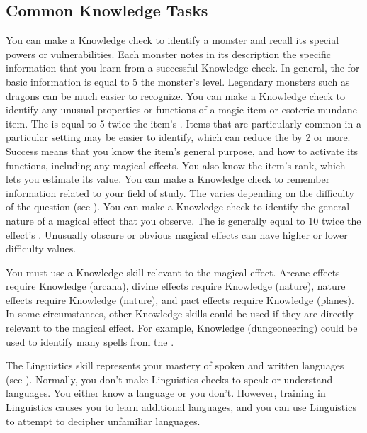     \subsection{Common Knowledge Tasks}
         You can make a Knowledge check to identify a monster and recall its special powers or vulnerabilities.
        Each monster notes in its description the specific information that you learn from a successful Knowledge check.
        In general, the  for basic information is equal to 5 \add the monster's level.
        Legendary monsters such as dragons can be much easier to recognize.
         You can make a Knowledge check to identify any unusual properties or functions of a magic item or esoteric mundane item.
        The  is equal to 5 \add twice the item's .
        Items that are particularly common in a particular setting may be easier to identify, which can reduce the  by 2 or more.
        Success means that you know the item's general purpose, and how to activate its functions, including any magical effects.
        You also know the item's rank, which lets you estimate its value.
         You can make a Knowledge check to remember information related to your field of study.
        The  varies depending on the difficulty of the question (see ).
         You can make a Knowledge check to identify the general nature of a magical effect that you observe.
        The  is generally equal to 10 \add twice the effect's .
        Unusually obscure or obvious magical effects can have higher or lower difficulty values.

        You must use a Knowledge skill relevant to the magical effect.
        Arcane effects require Knowledge (arcana), divine effects require Knowledge (nature), nature effects require Knowledge (nature), and pact effects require Knowledge (planes).
        In some circumstances, other Knowledge skills could be used if they are directly relevant to the magical effect.
        For example, Knowledge (dungeoneering) could be used to identify many spells from the  .

\newpage
{}
        The Linguistics skill represents your mastery of spoken and written languages (see ).
        Normally, you don't make Linguistics checks to speak or understand languages.
        You either know a language or you don't.
        However, training in Linguistics causes you to learn additional languages, and you can use Linguistics to attempt to decipher unfamiliar languages.

